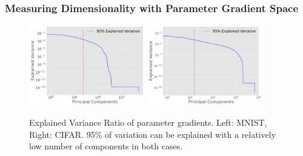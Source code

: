 \begin{frame}
  \frametitle{Measuring Dimensionality with Parameter Gradient Space}
\begin{figure}[t]
    \centering
    \includegraphics[width=0.45\textwidth]{c4a_figures/explained_variance_ratio.pdf}
    \includegraphics[width=0.45\textwidth]{c4a_figures/explained_variance_ratio_cifar.pdf}
    \caption{Explained Variance Ratio of parameter gradients. Left: MNIST, Right: CIFAR. 95\% of variation can be explained with a relatively low number of components in both cases.}
    \label{fig:rank}
  \end{figure}
  \end{frame}




